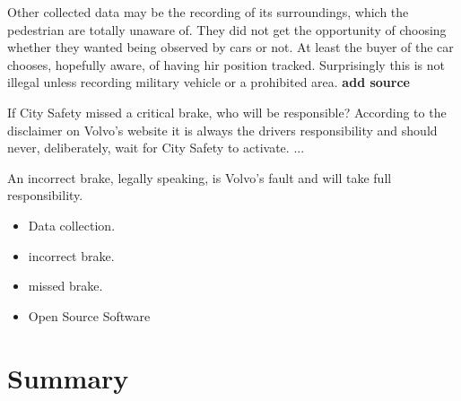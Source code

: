 \documentclass[conference]{IEEEtran}
\begin{document}
Other collected data may be the recording of its surroundings, which the pedestrian are totally unaware of. They did not get the opportunity of choosing whether they wanted being observed by cars or not. At least the buyer of the car chooses, hopefully aware, of having hir position tracked. Surprisingly this is not illegal unless recording military vehicle or a prohibited area. \textbf{add source}

If City Safety missed a critical brake, who will be responsible? According to the disclaimer on Volvo's website it is always the drivers responsibility and should never, deliberately, wait for City Safety to activate. ... \cite{CitySafetyLegal}

An incorrect brake, legally speaking, is Volvo's fault and will take full responsibility.

\begin{itemize}
	\item Data collection.
	\item incorrect brake.
	\item missed brake.
	\item Open Source Software
\end{itemize}


\section{Summary}

\end{document}
